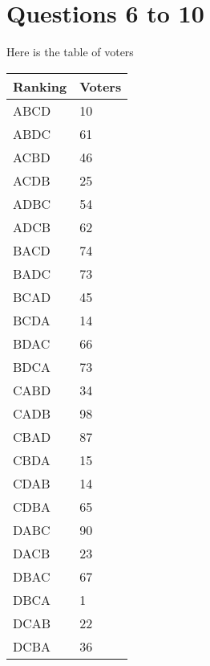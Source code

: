 \newpage

\section{Questions 6 to 10}
\label{questions6to10}

Here is the table of voters

\begin{table}[htbp]
\begin{minipage}{\linewidth}
\setlength{\tymax}{0.5\linewidth}
\centering
\small
\begin{tabulary}{\textwidth}{@{}ll@{}} \toprule
	Ranking	&	Voters	\\
\midrule

	ABCD	&	10	\\
	ABDC	&	61	\\
	ACBD	&	46	\\
	ACDB	&	25	\\
	ADBC	&	54	\\
	ADCB	&	62	\\
	BACD	&	74	\\
	BADC	&	73	\\
	BCAD	&	45	\\
	BCDA	&	14	\\
	BDAC	&	66	\\
	BDCA	&	73	\\
	CABD	&	34	\\
	CADB	&	98	\\
	CBAD	&	87	\\
	CBDA	&	15	\\
	CDAB	&	14	\\
	CDBA	&	65	\\
	DABC	&	90	\\
	DACB	&	23	\\
	DBAC	&	67	\\
	DBCA	&	1	\\
	DCAB	&	22	\\
	DCBA	&	36	\\
\bottomrule

\end{tabulary}
\end{minipage}
\end{table}


